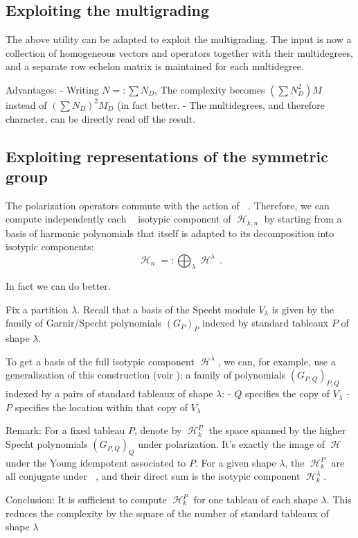 \documentclass[letter,12pt]{article}
\DeclareMathOperator{\Sn}{\mathbb{S}_n}
\DeclareMathOperator{\GLr}{GL_r}
\DeclareMathOperator{\harmonics}{\mathcal{H}}
\begin{document}
	\subsection{Exploiting the multigrading}
	
	The above utility can be adapted to exploit the multigrading. The input is now a collection of homogeneous vectors and operators together with their multidegrees, and a separate row echelon matrix is maintained for each multidegree.
	
	Advantages:
	- Writing $N=:\sum N_D$, The complexity becomes $(\sum N_D^2) M$ instead of $(\sum N_D)^2M_D$ (in fact better.
	- The multidegrees, and therefore $\GLr$ character, can be directly read off the result.
	
	\subsection{Exploiting representations of the symmetric group}
	
	The polarization operators commute with the action of $\Sn$. Therefore,
	we can compute independently each $\Sn$ isotypic component of $\harmonics_{k,n}$ by starting from a basis of harmonic polynomials that itself is adapted to its decomposition into isotypic components:
	$$\harmonics_{n}=:\bigoplus_\lambda \harmonics^\lambda\,.$$
	
	In fact we can do better.
	
	Fix a partition $\lambda$. Recall that a basis of the Specht module $V_\lambda$ is given by the family of Garnir/Specht polynomials $(G_{P})_P$ indexed by standard tableaux $P$ of shape $\lambda$.
	
	To get a basis of the full isotypic component $\harmonics^\lambda$, we can, for example, use a generalization of this construction (voir \cite{Ariki1997}): a family of polynomials $(G_{P,Q})_{P,Q}$ indexed by a pairs of standard tableaux of shape $\lambda$:
	- $Q$ specifies the copy of $V_\lambda$
	- $P$ specifies the location within that copy of $V_\lambda$
	
	
	Remark: For a fixed tableau $P$, denote by $\harmonics_k^P$ the space spanned by the higher Specht polynomials $(G_{P,Q})_Q$ under polarization. It's exactly the image of $\harmonics$ under the Young idempotent associated to $P$. For a given shape $\lambda$, the $\harmonics_k^P$ are all conjugate under $\Sn$, and their direct sum is the isotypic component $\harmonics_k^\lambda$.
	
	Conclusion: It is sufficient to compute $\harmonics_k^P$ for one tableau of each shape $\lambda$. This reduces the complexity by the square of the number of standard tableaux of shape $\lambda$
	
\end{document}
